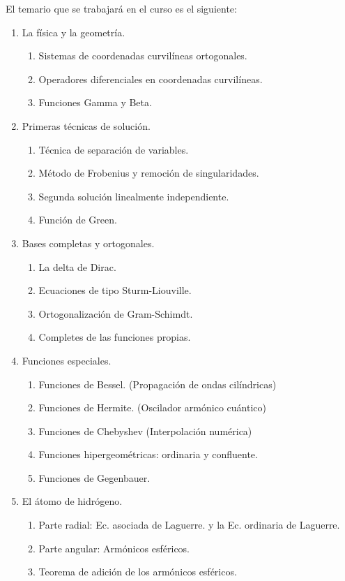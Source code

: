 \documentclass[12pt]{article}
\numberwithin{equation}{section}
\begin{document}
El temario que se trabajará en el curso es el siguiente:
\begin{enumerate}
\item La física y la geometría.
\begin{enumerate}
\item Sistemas de coordenadas curvilíneas ortogonales.
\item Operadores diferenciales en coordenadas curvilíneas.
\item Funciones Gamma y Beta.
\end{enumerate}
\item Primeras técnicas de solución.
\begin{enumerate}
\item Técnica de separación de variables.
\item Método de Frobenius y remoción de singularidades.
\item Segunda solución linealmente independiente.
\item Función de Green.
\end{enumerate}
\item Bases completas y ortogonales.
\begin{enumerate}
\item La delta de Dirac. 
\item Ecuaciones de tipo Sturm-Liouville.
\item Ortogonalización de Gram-Schimdt.
\item Completes de las funciones propias.
\end{enumerate}
\item Funciones especiales.
\begin{enumerate}
\item Funciones de Bessel. (Propagación de ondas cilíndricas)
\item Funciones de Hermite. (Oscilador armónico cuántico)
\item Funciones de Chebyshev (Interpolación numérica)
\item Funciones hipergeométricas: ordinaria y confluente.
\item Funciones de Gegenbauer.
\end{enumerate}
\item El átomo de hidrógeno.
\begin{enumerate}
\item Parte radial: Ec. asociada de Laguerre. y la Ec. ordinaria de Laguerre.
\item Parte angular: Armónicos esféricos.
\item Teorema de adición de los armónicos esféricos.

\end{enumerate}
\end{enumerate}
\end{document}
